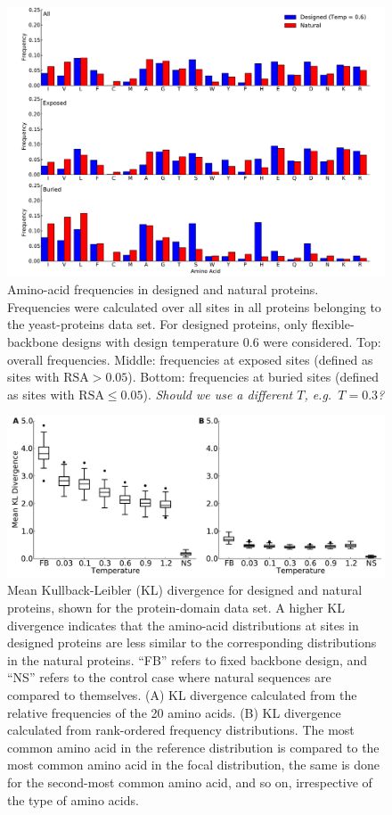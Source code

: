 \documentclass[12pt]{article}
\begin{document}
\begin{figure}[H]
\centerline{\includegraphics[width = 5in]{figures/Duncan_Freq_Combo_Plots_06.pdf}}
\caption{Amino-acid frequencies in designed and natural proteins. Frequencies were calculated over all sites in all proteins belonging to the yeast-proteins data set. For designed proteins, only flexible-backbone designs with design temperature 0.6 were considered. Top: overall frequencies. Middle: frequencies at exposed sites (defined as sites with $\text{RSA}>0.05$). Bottom: frequencies at buried sites (defined as sites with $\text{RSA}\leq0.05$). {\color{green}\emph{Should we use a different $T$, e.g.\ $T=0.3$?} }  }
\label{AAFreqsYeastProteins}
\end{figure}


\begin{figure}[H]
\centerline{\includegraphics[width = 6in]{figures/Mean_KL_vs_Temp_Boxplot.pdf}}
\caption{Mean Kullback-Leibler (KL) divergence for designed and natural proteins, shown for the protein-domain data set. A higher KL divergence indicates that the amino-acid distributions at sites in designed proteins are less similar to the corresponding distributions in the natural proteins. ``FB'' refers to fixed backbone design, and ``NS'' refers to the control case where natural sequences are compared to themselves. (A) KL divergence calculated from the relative frequencies of the 20 amino acids. (B) KL divergence calculated from rank-ordered frequency distributions. The most common amino acid in the reference distribution is compared to the most common amino acid in the focal distribution, the same is done for the second-most common amino acid, and so on, irrespective of the type of amino acids.}
\label{AADisFig1}
\end{figure}
\end{document}
